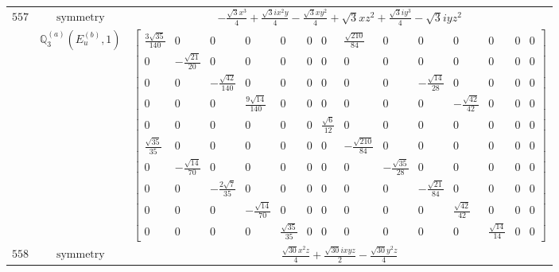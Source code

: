 \documentclass[fleqn,8pt,landscape]{jsarticle}
\begin{document}
\begin{longtable}{ccc}
$ 557 $ & $ \text{symmetry} $ & $ - \frac{\sqrt{3} x^{3}}{4} + \frac{\sqrt{3} i x^{2} y}{4} - \frac{\sqrt{3} x y^{2}}{4} + \sqrt{3} x z^{2} + \frac{\sqrt{3} i y^{3}}{4} - \sqrt{3} i y z^{2} $ \\
$  $ & $ \mathbb{Q}_{3}^{(a)}(E_{u}^{(b)},1) $ & $ \begin{bmatrix} \frac{3 \sqrt{35}}{140} & 0 & 0 & 0 & 0 & 0 & 0 & \frac{\sqrt{210}}{84} & 0 & 0 & 0 & 0 & 0 & 0 \\ 0 & - \frac{\sqrt{21}}{20} & 0 & 0 & 0 & 0 & 0 & 0 & 0 & 0 & 0 & 0 & 0 & 0 \\ 0 & 0 & - \frac{\sqrt{42}}{140} & 0 & 0 & 0 & 0 & 0 & 0 & - \frac{\sqrt{14}}{28} & 0 & 0 & 0 & 0 \\ 0 & 0 & 0 & \frac{9 \sqrt{14}}{140} & 0 & 0 & 0 & 0 & 0 & 0 & - \frac{\sqrt{42}}{42} & 0 & 0 & 0 \\ 0 & 0 & 0 & 0 & 0 & 0 & \frac{\sqrt{6}}{12} & 0 & 0 & 0 & 0 & 0 & 0 & 0 \\ \frac{\sqrt{35}}{35} & 0 & 0 & 0 & 0 & 0 & 0 & - \frac{\sqrt{210}}{84} & 0 & 0 & 0 & 0 & 0 & 0 \\ 0 & - \frac{\sqrt{14}}{70} & 0 & 0 & 0 & 0 & 0 & 0 & - \frac{\sqrt{35}}{28} & 0 & 0 & 0 & 0 & 0 \\ 0 & 0 & - \frac{2 \sqrt{7}}{35} & 0 & 0 & 0 & 0 & 0 & 0 & - \frac{\sqrt{21}}{84} & 0 & 0 & 0 & 0 \\ 0 & 0 & 0 & - \frac{\sqrt{14}}{70} & 0 & 0 & 0 & 0 & 0 & 0 & \frac{\sqrt{42}}{42} & 0 & 0 & 0 \\ 0 & 0 & 0 & 0 & \frac{\sqrt{35}}{35} & 0 & 0 & 0 & 0 & 0 & 0 & \frac{\sqrt{14}}{14} & 0 & 0 \end{bmatrix} $ \\ \hline
$ 558 $ & $ \text{symmetry} $ & $ \frac{\sqrt{30} x^{2} z}{4} + \frac{\sqrt{30} i x y z}{2} - \frac{\sqrt{30} y^{2} z}{4} $ \\

\end{longtable}
\end{document}
